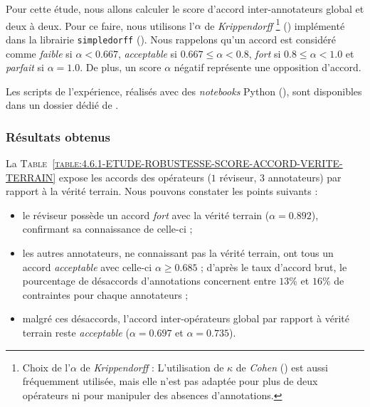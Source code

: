 			Pour cette étude, nous allons calculer le score d'accord inter-annotateurs global et deux à deux.
			Pour ce faire, nous utilisons l'$\alpha$ de \textit{Krippendorff} \footnote{
				Choix de l'$\alpha$ de \textit{Krippendorff} : L'utilisation de $\kappa$ de \textit{Cohen} (\cite{landis-koch:1977:measurement-observer-agreement}) est aussi fréquemment utilisée, mais elle n'est pas adaptée pour plus de deux opérateurs ni pour manipuler des absences d'annotations.
			} (\cite{krippendorff:2004:content-analysis-introduction}) implémenté dans la librairie \texttt{simpledorff} (\cite{perry:2021:lighttag-text-annotation}).
			Nous rappelons qu'un accord est considéré comme \textit{faible} si $\alpha<0.667$, \textit{acceptable} si $0.667 \leq \alpha<0.8$, \textit{fort} si $0.8 \leq \alpha<1.0$ et \textit{parfait} si $\alpha = 1.0$.
			De plus, un score $\alpha$ négatif représente une opposition d'accord.
			
			\begin{leftBarInformation}
				Les scripts de l'expérience, réalisés avec des \textit{notebooks} Python (\cite{van-rossum-drake:2009:python-reference-manual}), sont disponibles dans un dossier dédié de \cite{schild:2021:cognitivefactory-interactiveclusteringcomparativestudy}.
			\end{leftBarInformation}
			
		\subsubsection{Résultats obtenus}
		
			La \textsc{Table~\ref{table:4.6.1-ETUDE-ROBUSTESSE-SCORE-ACCORD-VERITE-TERRAIN}} expose les accords des opérateurs ($1$ réviseur, $3$ annotateurs) par rapport à la vérité terrain.
			Nous pouvons constater les points suivants :
			\begin{itemize}
				\item le réviseur possède un accord \textit{fort} avec la vérité terrain ($\alpha = 0.892$), confirmant sa connaissance de celle-ci ;
				\item les autres annotateurs, ne connaissant pas la vérité terrain, ont tous un accord \textit{acceptable} avec celle-ci $\alpha \geq 0.685$ ; d'après le taux d'accord brut, le pourcentage de désaccords d'annotations concernent entre $13$\% et $16$\% de contraintes pour chaque annotateurs ;
				\item malgré ces désaccords, l'accord inter-opérateurs global par rapport à vérité terrain reste \textit{acceptable} ($\alpha = 0.697$ et $\alpha = 0.735$).
			\end{itemize}
			
